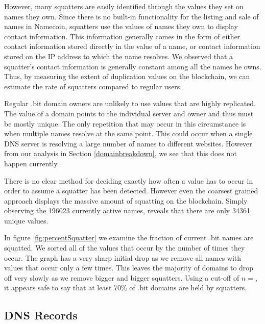 However, many squatters are easily identified through the values they set on names they own. Since there is no built-in functionality for the listing and sale of names in Namecoin, squatters use the values of names they own to display contact information. This information generally comes in the form of either contact information stored directly in the value of a name, or contact information stored on the IP address to which the name resolves.  We observed that a squatter's contact information is generally constant among all the names he owns. Thus, by measuring the extent of duplication values on the blockchain, we can estimate the rate of squatters compared to regular users.

Regular .bit domain owners are unlikely to use values that are highly replicated. The value of a domain points to the individual server and owner and thus must be mostly unique. The only repetition that may occur in this circumstance is when multiple names resolve at the same point. This could occur when a single DNS server is resolving a large number of names to different websites. However from our analysis in Section \ref{domainbreakdown}, we see that this does not happen currently.

There is no clear method for deciding exactly how often a value has to occur in order to assume a squatter has been detected. However even the coarsest grained approach displays the massive amount of squatting on the blockchain. Simply observing the 196023 currently active names, reveals that there are only 34361 unique values.

In figure \ref{fig:percentSquatter} we examine the fraction of current .bit names are squatted. We sorted all of the values that occur by the number of times they occur. 
The graph has a very sharp initial drop as we remove all names with values that occur only a few times. This leaves the majority of domains to drop off very slowly as we remove bigger and bigger squatters. Using a cut-off of $n=$\hi{[fill in]}, it appears safe to say that at least 70\% of .bit domains are held by squatters.

\subsection{DNS Records}

